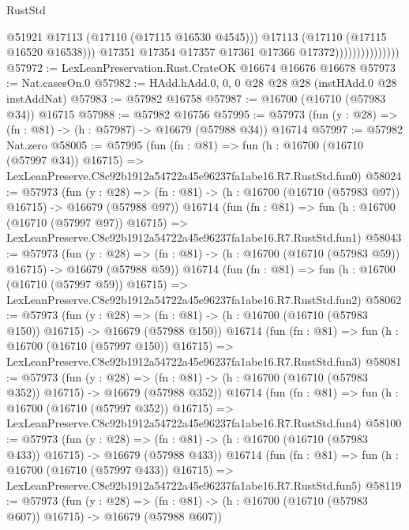 \begin{lexlean}{RustStd}
\begin{coremodule}
                                      @51921
                                      @17113
                                      (@17110 (@17115 @16530 @4545)))
                                    @17113
                                    (@17110 (@17115 @16520 @16538)))
                                  @17351
                                  @17354
                                  @17357
                                  @17361
                                  @17366
                                  @17372)))))))))))))))
@57972 := LexLeanPreservation.Rust.CrateOK @16674 @16676 @16678
@57973 := Nat.casesOn.{0}
@57982 := HAdd.hAdd.{0, 0, 0} @28 @28 @28 (instHAdd.{0} @28 instAddNat)
@57983 := @57982 @16758
@57987 := @16700 (@16710 (@57983 @34)) @16715
@57988 := @57982 @16756
@57995 := @57973 (fun (y : @28) => (fn : @81) -> (h : @57987) -> @16679 (@57988 @34)) @16714
@57997 := @57982 Nat.zero
@58005 := @57995
    (fun (fn : @81) =>
    fun (h : @16700 (@16710 (@57997 @34)) @16715) =>
    LexLeanPreserve.C8c92b1912a54722a45e96237fa1abe16.R7.RustStd.fun0)
@58024 := @57973
    (fun (y : @28) =>
    (fn : @81) -> (h : @16700 (@16710 (@57983 @97)) @16715) -> @16679 (@57988 @97))
    @16714
    (fun (fn : @81) =>
    fun (h : @16700 (@16710 (@57997 @97)) @16715) =>
    LexLeanPreserve.C8c92b1912a54722a45e96237fa1abe16.R7.RustStd.fun1)
@58043 := @57973
    (fun (y : @28) =>
    (fn : @81) -> (h : @16700 (@16710 (@57983 @59)) @16715) -> @16679 (@57988 @59))
    @16714
    (fun (fn : @81) =>
    fun (h : @16700 (@16710 (@57997 @59)) @16715) =>
    LexLeanPreserve.C8c92b1912a54722a45e96237fa1abe16.R7.RustStd.fun2)
@58062 := @57973
    (fun (y : @28) =>
    (fn : @81) -> (h : @16700 (@16710 (@57983 @150)) @16715) -> @16679 (@57988 @150))
    @16714
    (fun (fn : @81) =>
    fun (h : @16700 (@16710 (@57997 @150)) @16715) =>
    LexLeanPreserve.C8c92b1912a54722a45e96237fa1abe16.R7.RustStd.fun3)
@58081 := @57973
    (fun (y : @28) =>
    (fn : @81) -> (h : @16700 (@16710 (@57983 @352)) @16715) -> @16679 (@57988 @352))
    @16714
    (fun (fn : @81) =>
    fun (h : @16700 (@16710 (@57997 @352)) @16715) =>
    LexLeanPreserve.C8c92b1912a54722a45e96237fa1abe16.R7.RustStd.fun4)
@58100 := @57973
    (fun (y : @28) =>
    (fn : @81) -> (h : @16700 (@16710 (@57983 @433)) @16715) -> @16679 (@57988 @433))
    @16714
    (fun (fn : @81) =>
    fun (h : @16700 (@16710 (@57997 @433)) @16715) =>
    LexLeanPreserve.C8c92b1912a54722a45e96237fa1abe16.R7.RustStd.fun5)
@58119 := @57973
    (fun (y : @28) =>
    (fn : @81) -> (h : @16700 (@16710 (@57983 @607)) @16715) -> @16679 (@57988 @607))

\end{coremodule}
\end{lexlean}
